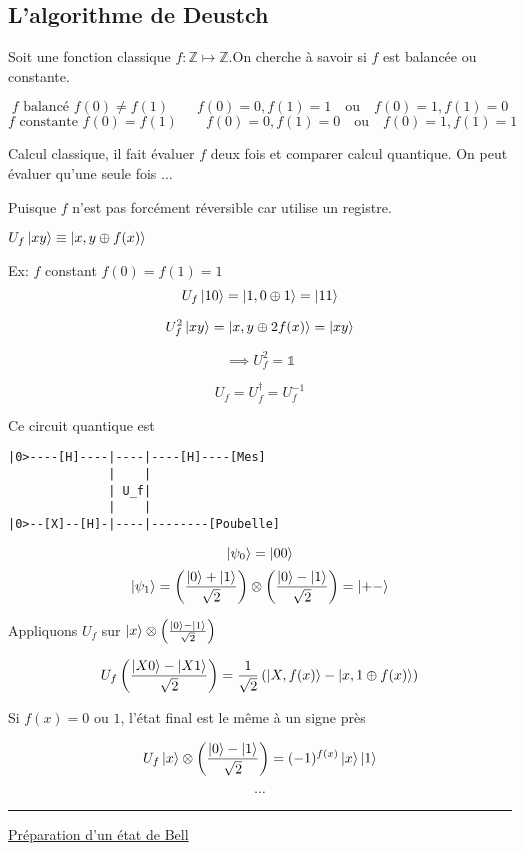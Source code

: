 \subsection{L'algorithme de Deustch}

Soit une fonction classique $f: \mathds{Z}  \mapsto \mathds{Z}$.On cherche à savoir si $f$ est balancée ou constante. 

$$f \text{ balancé } f(0)\neq f(1) \qquad f(0) = 0, f(1)=1 \quad \text{ou}\quad f(0)=1, f(1)=0$$ 
$$f \text{ constante } f(0)= f(1)\qquad f(0) = 0, f(1)=0 \quad \text{ou}\quad f(0)=1, f(1)=1 $$ 

Calcul classique, il fait évaluer $f$ deux fois et comparer calcul quantique. On peut évaluer qu'une seule fois ...


Puisque $f$ n'est pas forcément réversible car utilise un registre.

$U_f \ket{xy} \equiv \ket{x, y \oplus f(x) }$ 

Ex: $f$ constant $f(0)=f(1)=1$  
$$U_f \ket{10}= \ket{1, 0 \oplus 1} = \ket{11}$$ 

$$U_f^{2}\ket{xy} = \ket{x,y \oplus 2 f(x)} = \ket{xy}$$ 

$$\implies U_f^{2}= \mathds{1}$$ 

$$U_f = U_f^{\dagger} = U_f^{-1}$$ 

Ce circuit quantique est 
\begin{verbatim}
|0>----[H]----|----|----[H]----[Mes]
              |    |
              | U_f|
              |    |
|0>--[X]--[H]-|----|--------[Poubelle]
\end{verbatim}

$$\ket{\psi_{0}} = \ket{00}$$ 
$$\ket{\psi_{1}} = \left( \frac{\ket{0}+\ket{1}}{\sqrt{2}}  \right) \otimes \left( \frac{\ket{0}-\ket{1}}{\sqrt{2}}  \right) = \ket{+-}$$ 

Appliquons $U_f$ sur $\ket{x} \otimes \left( \frac{\ket{0}-\ket{1}}{\sqrt{2}}  \right) $  

$$U_f \left( \frac{\ket{X0}-\ket{X1}}{\sqrt{2}}  \right) = \frac{1}{\sqrt{2}} \left( \ket{X,f(x)} - \ket{x, 1 \oplus f(x)} \right) $$ 

Si $f(x)=0$ ou $1$, l'état final est le même à un signe près  


$$U_f \ket{x} \otimes \left( \frac{\ket{0}-\ket{1}}{\sqrt{2}}  \right) = (-1)^{f(x)} \ket{x}\ket{1}$$ 

$$\dotsb$$ 


\hrule

\underline{Préparation d'un état de Bell} 


